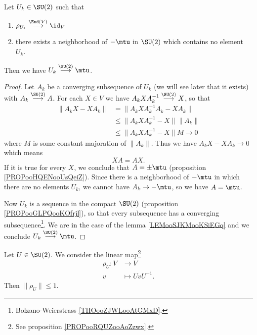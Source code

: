 \begin{lemma}        \label{LEMooBHVBooEPbWwZ}
	Let \( U_k\in \SU(2)\) such that
	\begin{enumerate}
		\item
		      \( \rho_{U_k}\stackrel{\End(V)}{\longrightarrow}\id_V\)
		\item
		      there exists a neighborhood of \( -\mtu\) in \( \SU(2)\) which contains no element \( U_k\).
	\end{enumerate}
	Then we have \( U_k\stackrel{\SU(2)}{\longrightarrow}\mtu\).
\end{lemma}

\begin{proof}
	Let \( A_k\) be a converging subsequence of \( U_k\) (we will see later that it exists) with \( A_k\stackrel{\SU(2)}{\longrightarrow}A\). For each \( X\in V\) we have \( A_kXA_k^{-1}\stackrel{\SU(2)}{\longrightarrow}X\), so that
	\begin{subequations}
		\begin{align}
			\| A_kX-XA_k \| & =\| A_kXA_k^{-1}A_k-XA_k \|       \\
			                & \leq\| A_kXA_k^{-1}-X \|\| A_k \| \\
			                & \leq \| A_kXA_k^{-1}-X \|M\to 0
		\end{align}
	\end{subequations}
	where \( M\) is some constant majoration of \( \| A_k \|\). Thus we have \( A_kX-XA_k\to 0\) which means
	\begin{equation}
		XA=AX.
	\end{equation}
	If it is true for every \( X\), we conclude that \( A=\pm\mtu\) (proposition \ref{PROPooHQENooUsQeiZ}). Since there is a neighborhood of \( -\mtu\) in which there are no elements \( U_k\), we cannot have \( A_k\to -\mtu\), so we have \( A=\mtu\).

	Now \( U_k\) is a sequence in the compact \( \SU(2)\) (proposition \ref{PROPooGLPQooKOfrjl}), so that every subsequence has a converging subsequence\footnote{Bolzano-Weierstrass \ref{THOooZJWLooAtGMxD}.}. We are in the case of the lemma \ref{LEMooSJKMooKSiEGq} and we conclude \( U_k\stackrel{\SU(2)}{\longrightarrow}\mtu\).
\end{proof}

\begin{lemma}        \label{LEMooMNWSooAjmBQK}
	Let \( U\in \SU(2)\). We consider the linear map\footnote{See proposition \ref{PROPooRQUZooAoZzwx}.}
	\begin{equation}
		\begin{aligned}
			\rho_U\colon V & \to V             \\
			v              & \mapsto UvU^{-1}.
		\end{aligned}
	\end{equation}
	Then \( \| \rho_U \|\leq 1\).
\end{lemma}

